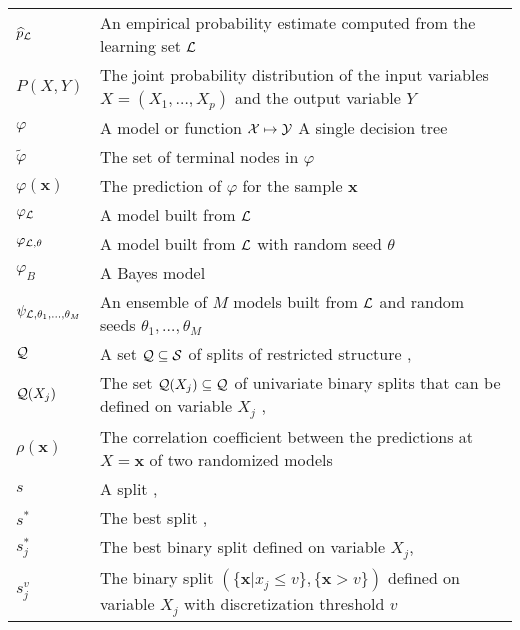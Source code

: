 \begin{tabularx}{\textwidth}{ l X }
$\widehat{p}_{\cal L}$ & An empirical probability estimate computed from the learning set ${\cal L}$\dotfill  \pageref{eqn:4:proba-estimates}\\
$P(X,Y)$ & The joint probability distribution of the input variables $X=(X_1,\dots,X_p)$ and the output variable $Y$ \dotfill  \pageref{ntn:P_XY}\\
$\varphi$ & A model or function ${\cal X} \mapsto {\cal Y}$ \dotfill  \pageref{ntn:varphi}\newline A single decision tree \dotfill  \pageref{ntn:tree}\\
$\widetilde{\varphi}$ & The set of terminal nodes in $\varphi$ \dotfill  \pageref{ntn:varphi-leafs}\\
$\varphi(\mathbf{x})$ & The prediction of $\varphi$ for the sample $\mathbf{x}$ \dotfill  \pageref{ntn:varphi-x}\\
$\varphi_{\cal L}$ & A model built from ${\cal L}$ \dotfill  \pageref{ntn:varphi-L}\\
$\varphi_{{\cal L},\theta}$ & A model built from ${\cal L}$ with random seed $\theta$ \dotfill  \pageref{ntn:varphi-Ltheta}\\
$\varphi_B$ & A Bayes model \dotfill  \pageref{ntn:varphi-B}\\
$\psi_{{\cal L},\theta_1,\dots,\theta_M}$ & An ensemble of $M$ models built from ${\cal L}$ and random seeds $\theta_1, \dots, \theta_M$ \dotfill \pageref{ntn:psi} \\
${\cal Q}$ & A set ${\cal Q} \subseteq {\cal S}$ of splits of restricted structure \dotfill \pageref{ntn:Q}, \pageref{ntn:Q2}\\
${\cal Q}(X_j)$ & The set ${\cal Q}(X_j) \subseteq {\cal Q}$ of univariate binary splits that can be defined on variable $X_j$ \dotfill \pageref{eqn:q:ordered}, \pageref{eqn:q:categorical-cart}\\
$\rho(\mathbf{x})$ & The correlation coefficient between the predictions at $X=\mathbf{x}$ of two randomized models \dotfill \pageref{eqn:4:correlation} \\
$s$ & A split \dotfill  \pageref{ntn:s}, \pageref{ntn:s2}\\
$s^*$ & The best split \dotfill  \pageref{ntn:s-star}, \pageref{eqn:best-best-split}\\
$s^*_j$ & The best binary split defined on variable $X_j$\dotfill  \pageref{ntn:s-star}, \pageref{eqn:best-split-single}\\
$s_j^v$ & The binary split $(\{\mathbf{x}|x_j \leq v\}, \{\mathbf{x} > v\})$ defined on variable $X_j$ with discretization threshold $v$ \dotfill  \pageref{ntn:s_jv}\\

\end{tabularx}
